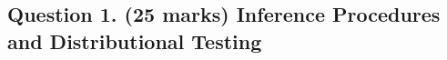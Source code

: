 \documentclass[a4paper,12pt]{article}
\begin{document}
\subsection*{Question 1. (25 marks) Inference Procedures and Distributional Testing}\label{sec:question-1.-(25-marks)-inference-procedures-and-distributional-testing}
	
\end{document}
